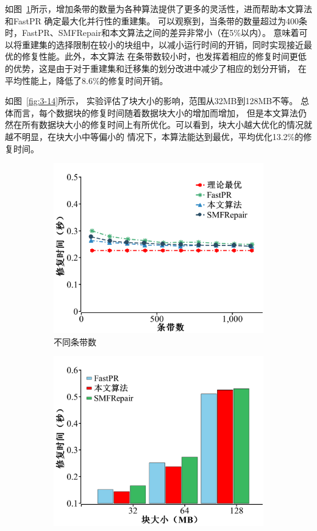 如图~\ref{fig:3-12}所示，增加条带的数量为各种算法提供了更多的灵活性，进而帮助本文算法和FastPR
确定最大化并行性的重建集。
可以观察到，当条带的数量超过为400条时，FastPR、SMFRepair和本文算法之间的差异非常小（在5\%以内）。
意味着可以将重建集的选择限制在较小的块组中，以减小运行时间的开销，同时实现接近最优的修复性能。此外，本文算法
在条带数较小时，也发挥着相应的修复时间更低的优势，这是由于对于重建集和迁移集的划分改进中减少了相应的划分开销，
在平均性能上，降低了8.6\%的修复时间开销。

如图~\ref{fig:3-14}所示，
实验评估了块大小的影响，范围从32MB到128MB不等。
总体而言，每个数据块的修复时间随着数据块大小的增加而增加，
但是本文算法仍然在所有数据块大小的修复时间上有所优化。可以看到，块大小越大优化的情况就越不明显，在块大小中等偏小的
情况下，本算法能达到最优，平均优化13.2\%的修复时间。


\begin{figure}[htbp]
	\centering
	\begin{subfigure}[t]{0.4\textwidth}
		\centering
		\includegraphics[width=1.0\linewidth]{figures/3-12.pdf}
		\caption{不同条带数}
		\label{fig:3-12}
	\end{subfigure}
	\begin{subfigure}[t]{0.4\textwidth}
		\centering
		\includegraphics[width=1.1\linewidth]{figures/3-14.pdf}

\end{subfigure}
\end{figure}
